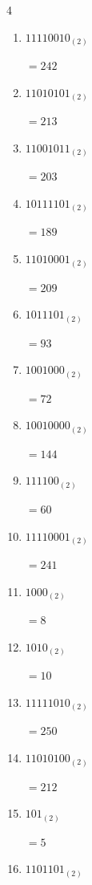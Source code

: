 \begin{multicols}{4}
\begin{enumerate}
        $=99$

  \item $11110010_{(2)}$

        $=242$

  \item $11010101_{(2)}$

        $=213$

  \item $11001011_{(2)}$

        $=203$

  \item $10111101_{(2)}$

        $=189$

  \item $11010001_{(2)}$

        $=209$

  \item $1011101_{(2)}$

        $=93$

  \item $1001000_{(2)}$

        $=72$

  \item $10010000_{(2)}$

        $=144$

  \item $111100_{(2)}$

        $=60$

  \item $11110001_{(2)}$

        $=241$

  \item $1000_{(2)}$

        $=8$

  \item $1010_{(2)}$

        $=10$

\columnbreak %

  \item $11111010_{(2)}$

        $=250$

  \item $11010100_{(2)}$

        $=212$

  \item $101_{(2)}$

        $=5$

  \item $1101101_{(2)}$


\end{enumerate}
\end{multicols}
